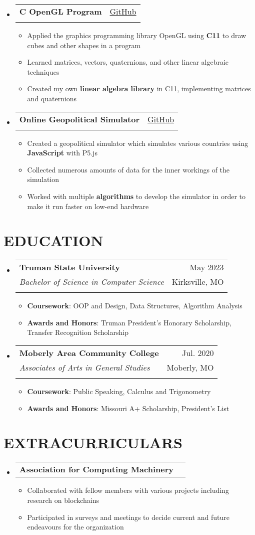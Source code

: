 \documentclass[letterpaper,11pt]{article}
\makeatletter
\newcommand{\resumeItem}[1]{
  \item\small{
    {#1 \vspace{-1pt}}
  }
}
\newcommand{\resumeSubheading}[5]{
  \vspace{-1pt}\item
    \begin{tabular*}{\textwidth}[t]{l@{\extracolsep{\fill}}r}
      \textbf{#1} & {\color{dark-grey}\small #2}\vspace{1pt}\\ %
      \textit{#3} & {\color{dark-grey} \small #4}\vspace{1pt}\\ %
      & \color{dark-grey} \small #5
    \end{tabular*}\vspace{-20pt}
}
\newcommand{\resumeProjectHeading}[4]{
  \vspace{-1pt}\item
    \begin{tabular*}{\textwidth}[t]{l@{\extracolsep{\fill}}r}
      \textbf{#1} & {\color{dark-grey}\small #2}\vspace{1pt}\\ %
      \textit{#3} & {\color{dark-grey} \small #4}\vspace{1pt}\\ %
    \end{tabular*}\vspace{-20pt}
}
\newcommand{\resumeExtracurricularsHeading}[1]{
    \item
    \begin{tabular*}{\textwidth}{l@{\extracolsep{\fill}}r}
      #1 & {\color{dark-grey}} \\
    \end{tabular*}\vspace{-7pt}
}
\newcommand{\resumeSubHeadingListStart}{\begin{itemize}[leftmargin=0in, label={}]}
\newcommand{\resumeSubHeadingListEnd}{\end{itemize}}
\newcommand{\resumeItemListStart}{\begin{itemize}\setlength{\itemindent}{-1em}}
\newcommand{\resumeItemListEnd}{\end{itemize}\vspace{0pt}}
\makeatother
\begin{document}
\resumeSubHeadingListStart
\resumeProjectHeading
{C OpenGL Program}{\href{https://github.com/jagger-harris/opengl-c-example-program}{GitHub}}
{}{}
\resumeItemListStart
\resumeItem{Applied the graphics programming library OpenGL using \textbf{C11} to draw cubes and other shapes in a program}
\resumeItem{Learned matrices, vectors, quaternions, and other linear algebraic techniques}
\resumeItem{Created my own \textbf{linear algebra library} in C11, implementing matrices and quaternions}
\resumeItemListEnd
\resumeSubHeadingListEnd

\resumeSubHeadingListStart
\resumeProjectHeading
{Online Geopolitical Simulator}{\href{https://github.com/jagger-harris/online-geopolitical-simulator}{GitHub}}
{}{}
\resumeItemListStart
\resumeItem{Created a geopolitical simulator which simulates various countries using \textbf{JavaScript} with P5.js}
\resumeItem{Collected numerous amounts of data for the inner workings of the simulation}
\resumeItem{Worked with multiple \textbf{algorithms} to develop the simulator in order to make it run faster on low-end hardware}
\resumeItemListEnd
\resumeSubHeadingListEnd

\section{EDUCATION}
\resumeSubHeadingListStart

\resumeSubheading
{Truman State University}{May 2023}
{Bachelor of Science in Computer Science}{Kirksville, MO}
{}
\resumeItemListStart
\resumeItem {\textbf{Coursework}: OOP and Design, Data Structures, Algorithm Analysis}
\resumeItem
{\textbf{Awards and Honors}: Truman President's Honorary Scholarship, Transfer Recognition Scholarship}
\resumeItemListEnd

\resumeSubheading
{Moberly Area Community College}{Jul. 2020}
{Associates of Arts in General Studies}{Moberly, MO}
{}
\resumeItemListStart
\resumeItem {\textbf{Coursework}: Public Speaking, Calculus and Trigonometry}
\resumeItem
{\textbf{Awards and Honors}: Missouri A+ Scholarship, President's List}
\resumeItemListEnd
\resumeSubHeadingListEnd

\section{EXTRACURRICULARS}
\resumeSubHeadingListStart
\resumeExtracurricularsHeading
{\textbf{Association for Computing Machinery}}
\resumeItemListStart
\resumeItem{Collaborated with fellow members with various projects including research on blockchains}
\resumeItem{Participated in surveys and meetings to decide current and future endeavours for the organization}
\resumeItemListEnd
\resumeSubHeadingListEnd
\end{document}
